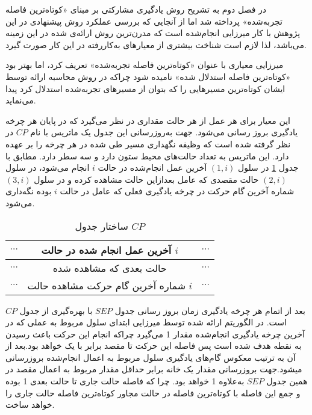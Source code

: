 در فصل دوم به تشریح روش یادگیری مشارکتی بر مبنای «کوتاه‌ترین فاصله تجربه‌شده» پرداخته شد اما از آنجایی که بررسی عملکرد روش پیشنهادی در این پژوهش با کار میرزایی انجام‌شده است که مدرن‌ترین روش ارائه‌ی شده در این زمینه می‌باشد، لذا لازم است شناخت بیشتری از معیارهای به‌کاررفته در این کار صورت گیرد.

میرزایی معیاری با عنوان «کوتاه‌ترین فاصله تجربه‌شده» تعریف کرد، اما بهتر بود «کوتاه‌ترین فاصله استدلال شده» نامیده شود چراکه در روش محاسبه ارائه توسط ایشان کوتاه‌ترین مسیرهایی را که بتوان از مسیرهای تجربه‌شده استدلال کرد پیدا می‌نماید.

این معیار برای هر عمل از هر حالت مقداری در نظر می‌گیرد که در پایان هر چرخه یادگیری بروز رسانی می‌شود. جهت به‌روزرسانی این جدول یک ماتریس با نام $CP$ در نظر گرفته‌ شده است که وظیفه نگهداری مسیر طی شده در هر چرخه را بر عهده دارد. این ماتریس به تعداد حالت‌های محیط ستون دارد و سه سطر دارد. مطابق با جدول \ref{tab:cp} در سلول $(1,i)$ آخرین عمل انجام‌شده در حالت $i$ انجام می‌شود، در سلول $(2,i)$ حالت مقصدی که عامل بعدازاین حالت مشاهده کرده و در سلول $(3,i)$ شماره آخرین گام حرکت در چرخه یادگیری فعلی که عامل در حالت $i$ بوده نگه‌داری می‌شود.

\begin{table}
\centering
\caption{ساختار جدول $CP$}\label{tab:cp}
\begin{tabular}{|c|c|c|}
\hline
$\cdots$ & آخرین عمل انجام شده در حالت $i$ & $\cdots$
\\\hline
$\cdots$ & حالت بعدی که مشاهده شده & $\cdots$
\\\hline
$\cdots$ & شماره آخرین گام حرکت مشاهده حالت $i$ & $\cdots$
\\\hline
\end{tabular}
\end{table}

بعد از اتمام هر چرخه یادگیری زمان بروز رسانی جدول $SEP$ با بهره‌گیری از جدول $CP$ است. در الگوریتم ارائه شده توسط میرزایی ابتدای سلول مربوط به عملی که در آخرین چرخه یادگیری انجام‌شده مقدار 1 می‌گیرد چراکه انجام این حرکت باعث رسیدن به نقطه هدف شده است پس فاصله این حرکت تا مقصد برابر با یک خواهد بود.بعد از آن به ترتیب معکوس گام‌های یادگیری سلول مربوط به اعمال انجام‌شده بروزرسانی میشود.جهت بروزرسانی مقدار یک خانه برابر حداقل مقدار مربوط به اعمال مقصد در همین جدول $SEP$ به‌علاوه 1 خواهد بود. چرا که فاصله حالت جاری تا حالت بعدی 1 بوده و جمع این فاصله با کوتاه‌ترین فاصله در حالت مجاور کوتاه‌ترین فاصله حالت جاری را خواهد ساخت.

